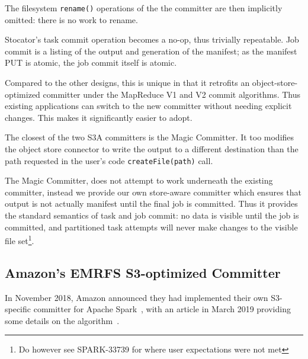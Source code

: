 \documentclass[conference]{IEEEtran}
\newcommand{\TODO}{\emph{TODO}\ }
\begin{document}
The filesystem \texttt{rename()} operations of the the committer are then implicitly
omitted: there is no work to rename.


Stocator's task commit operation becomes a no-op, thus trivially repeatable.
Job commit is a listing of the output and generation of the manifest;
as the manifest PUT is atomic, the job commit itself is atomic.

%

Compared to the other designs, this is unique in that it retrofits an
object-store-optimized committer under the MapReduce V1 and V2 commit algorithms.
Thus existing applications can switch to the new committer without needing
explicit changes.
This makes it significantly easier to adopt.


The closest of the two S3A committers is the Magic Committer.
It too modifies the object store connector to write the output to a
different destination than the path requested
in the user's code \texttt{createFile(path)} call.

The Magic Committer, does not attempt to work underneath the existing committer,
instead we provide our own store-aware committer
which ensures that output is not actually manifest until
the final job is committed.
Thus it provides the standard semantics of task and job commit: no data is
visible until the job is committed, and partitioned task attempts will
never make changes to the visible file set\footnote{Do however see SPARK-33739 for where user expectations were not met}.


\subsection{Amazon's EMRFS S3-optimized Committer}
\label{subsec:emrfs-committer}

In November 2018, Amazon announced they had implemented their own S3-specific
committer for Apache Spark\ \cite{AWS-EMR-committer}, with an article
in March 2019 providing some details on the algorithm\ \cite{AWS-EMR-committer-blog}.
\end{document}
